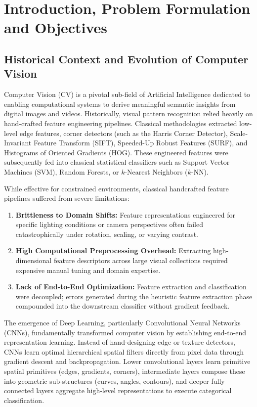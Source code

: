 \documentclass[11pt,a4paper,oneside]{report}
\begin{document}
\newpage
{}
\setcounter{page}{1}

\chapter{Introduction, Problem Formulation and Objectives}

\section{Historical Context and Evolution of Computer Vision}
Computer Vision (CV) is a pivotal sub-field of Artificial Intelligence dedicated to enabling computational systems to derive meaningful semantic insights from digital images and videos. Historically, visual pattern recognition relied heavily on hand-crafted feature engineering pipelines. Classical methodologies extracted low-level edge features, corner detectors (such as the Harris Corner Detector), Scale-Invariant Feature Transform (SIFT), Speeded-Up Robust Features (SURF), and Histograms of Oriented Gradients (HOG). These engineered features were subsequently fed into classical statistical classifiers such as Support Vector Machines (SVM), Random Forests, or $k$-Nearest Neighbors ($k$-NN).

While effective for constrained environments, classical handcrafted feature pipelines suffered from severe limitations:
\begin{enumerate}[leftmargin=*]
    \item \textbf{Brittleness to Domain Shifts:} Feature representations engineered for specific lighting conditions or camera perspectives often failed catastrophically under rotation, scaling, or varying contrast.
    \item \textbf{High Computational Preprocessing Overhead:} Extracting high-dimensional feature descriptors across large visual collections required expensive manual tuning and domain expertise.
    \item \textbf{Lack of End-to-End Optimization:} Feature extraction and classification were decoupled; errors generated during the heuristic feature extraction phase compounded into the downstream classifier without gradient feedback.
\end{enumerate}

The emergence of Deep Learning, particularly Convolutional Neural Networks (CNNs), fundamentally transformed computer vision by establishing end-to-end representation learning. Instead of hand-designing edge or texture detectors, CNNs learn optimal hierarchical spatial filters directly from pixel data through gradient descent and backpropagation. Lower convolutional layers learn primitive spatial primitives (edges, gradients, corners), intermediate layers compose these into geometric sub-structures (curves, angles, contours), and deeper fully connected layers aggregate high-level representations to execute categorical classification.
\end{document}
